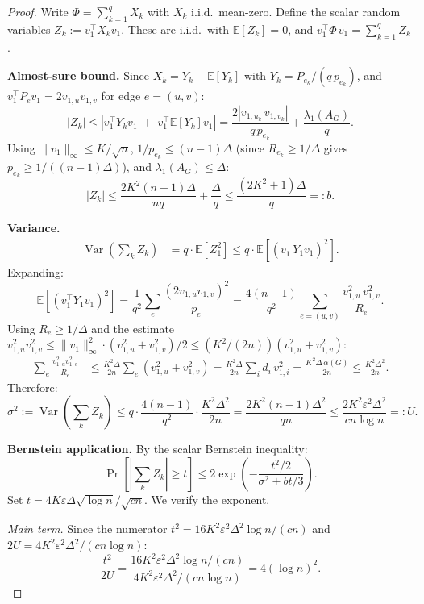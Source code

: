 \documentclass[11pt]{article}
\theoremstyle{definition}
\newcommand{\eps}{\varepsilon}
\newcommand{\lamG}{\lambda_1(A_G)}
\newcommand{\vone}{v_1}
\newcommand{\E}{\mathbb{E}}
\DeclareMathOperator{\Var}{Var}
\begin{document}
\begin{proof}
Write $\Phi = \sum_{k=1}^q X_k$ with $X_k$ i.i.d.\ mean-zero.
Define the scalar random variables $Z_k := \vone^\top X_k \vone$. These are
i.i.d.\ with $\E[Z_k] = 0$, and $\vone^\top \Phi\,\vone = \sum_{k=1}^q Z_k$.

\medskip\noindent\textbf{Almost-sure bound.}
Since $X_k = Y_k - \E[Y_k]$ with $Y_k = P_{e_k}/(q\,p_{e_k})$, and
$\vone^\top P_e \vone = 2v_{1,u}v_{1,v}$ for edge $e = (u,v)$:
\[
|Z_k| \leq |\vone^\top Y_k \vone| + |\vone^\top \E[Y_k] \vone|
= \frac{2|v_{1,u_k}\,v_{1,v_k}|}{q\,p_{e_k}} + \frac{\lamG}{q}.
\]
Using $\|\vone\|_\infty \leq K/\sqrt{n}$, $1/p_{e_k} \leq (n-1)\Delta$
(since $R_{e_k} \geq 1/\Delta$ gives $p_{e_k} \geq 1/((n-1)\Delta)$), and
$\lamG \leq \Delta$:
\[
|Z_k| \leq \frac{2K^2(n-1)\Delta}{nq} + \frac{\Delta}{q}
\leq \frac{(2K^2+1)\Delta}{q} =: b.
\]

\medskip\noindent\textbf{Variance.}
\begin{align*}
\Var\!\left(\sum_k Z_k\right) &= q \cdot \E[Z_1^2] \leq q \cdot \E[(\vone^\top Y_1 \vone)^2].
\end{align*}
Expanding:
\[
\E[(\vone^\top Y_1 \vone)^2]
= \frac{1}{q^2} \sum_e \frac{(2v_{1,u}v_{1,v})^2}{p_e}
= \frac{4(n-1)}{q^2} \sum_{e=(u,v)} \frac{v_{1,u}^2\,v_{1,v}^2}{R_e}.
\]
Using $R_e \geq 1/\Delta$ and the estimate
$v_{1,u}^2 v_{1,v}^2 \leq \|\vone\|_\infty^2 \cdot (v_{1,u}^2 + v_{1,v}^2)/2
\leq (K^2/(2n))(v_{1,u}^2 + v_{1,v}^2)$:
\begin{align*}
\sum_e \frac{v_{1,u}^2 v_{1,v}^2}{R_e}
&\leq \frac{K^2\Delta}{2n}\sum_e (v_{1,u}^2 + v_{1,v}^2)
= \frac{K^2\Delta}{2n}\sum_i d_i\,v_{1,i}^2
= \frac{K^2\Delta\,\alpha(G)}{2n}
\leq \frac{K^2\Delta^2}{2n}.
\end{align*}
Therefore:
\[
\sigma^2 := \Var\!\left(\sum_k Z_k\right)
\leq q \cdot \frac{4(n-1)}{q^2} \cdot \frac{K^2\Delta^2}{2n}
= \frac{2K^2(n-1)\Delta^2}{qn}
\leq \frac{2K^2\eps^2\Delta^2}{cn\log n} =: U.
\]

\medskip\noindent\textbf{Bernstein application.}
By the scalar Bernstein inequality:
\[
\Pr\!\left[\left|\sum_k Z_k\right| \geq t\right]
\leq 2\exp\!\left(-\frac{t^2/2}{\sigma^2 + bt/3}\right).
\]
Set $t = 4K\eps\Delta\sqrt{\log n}/\sqrt{cn}$. We verify the exponent.

\medskip\noindent\emph{Main term.}
Since the numerator $t^2 = 16K^2\eps^2\Delta^2\log n/(cn)$ and
$2U = 4K^2\eps^2\Delta^2/(cn\log n)$:
\[
\frac{t^2}{2U}
= \frac{16K^2\eps^2\Delta^2\log n/(cn)}{4K^2\eps^2\Delta^2/(cn\log n)}
= 4(\log n)^2.
\]


\end{proof}
\end{document}
